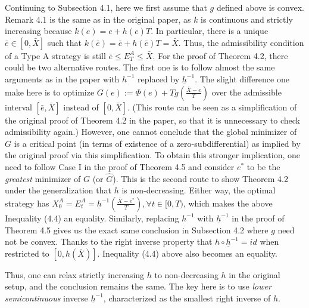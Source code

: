 \documentclass[openany,oneside]{article}
\theoremstyle{definition}
\theoremstyle{remark}
\begin{document}
Continuing to Subsection 4.1, here we first assume that $g$ defined above is convex. Remark 4.1 is the same as in the original paper, as $k$ is continuous and strictly increasing because $k(e) = e + h(e) T$. In particular, there is a unique $\bar{e} \in [0,\bar{X}]$ such that $k(\bar{e}) = \bar{e} + h(\bar{e}) T = \bar{X}$. Thus, the admissibility condition of a Type A strategy is still $\bar{e} \le E^A_T \le \bar{X}$. For the proof of Theorem 4.2, there could be two alternative routes. The first one is to follow almost the same arguments as in the paper with $h^{-1}$ replaced by $\underline{h}^{-1}$. The slight difference one make here is to optimize $G(e) := \Phi(e) + T g\left(\frac{\bar{X}-e}{T}\right)$ over the admissible interval $[\bar{e}, \bar{X}]$ instead of $[0,\bar{X}]$. (This route can be seen as a simplification of the original proof of Theorem 4.2 in the paper, so that it is unnecessary to check admissibility again.) However, one cannot conclude that the global minimizer of $G$ is a critical point (in terms of existence of a zero-subdifferential) as implied by the original proof via this simplification. To obtain this stronger implication, one need to follow Case I in the proof of Theorem 4.5 and consider $e^\ast$ to be the \emph{greatest} minimizer of $G$ (or $\hat{G}$). This is the second route to show Theorem 4.2 under the generalization that $h$ is non-decreasing. Either way, the optimal strategy has $X^A_0 = E^A_t = \underline{h}^{-1}\left(\frac{\bar{X}-e^\ast}{T}\right), \forall t\in[0,T)$, which makes the above Inequality (4.4) an equality. Similarly, replacing $h^{-1}$ with $\underline{h}^{-1}$ in the proof of Theorem 4.5 gives us the exact same conclusion in Subsection 4.2 where $g$ need not be convex. Thanks to the right inverse property that $h\circ \underline{h}^{-1} = id$ when restricted to $[0,h(\bar{X})]$. Inequality (4.4) above also becomes an equality.

Thus, one can relax strictly increasing $h$ to non-decreasing $h$ in the original setup, and the conclusion remains the same. The key here is to use \emph{lower semicontinuous} inverse $\underline{h}^{-1}$, characterized as the smallest right inverse of $h$.
\end{document}
